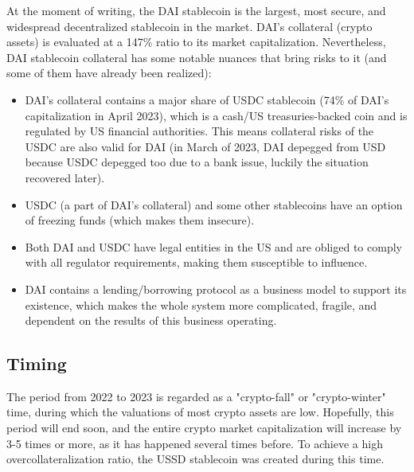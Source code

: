 At the moment of writing, the DAI stablecoin is the largest, most secure, and widespread 
decentralized stablecoin in the market. DAI's collateral (crypto assets) is evaluated at a 
147\% ratio to its market capitalization. Nevertheless, DAI stablecoin collateral has some 
notable nuances that bring risks to it (and some of them have already been realized):
\begin{itemize}
  \item DAI's collateral contains a major share of USDC stablecoin (74\% of DAI's capitalization 
  in April 2023), which is a cash/US treasuries-backed coin and is regulated by US financial authorities. 
  This means collateral risks of the USDC are also valid for DAI (in March of 2023, DAI depegged 
  from USD because USDC depegged too due to a bank issue, luckily the situation recovered later).
  \item USDC (a part of DAI's collateral) and some other stablecoins have an option of freezing 
  funds (which makes them insecure).
  \item Both DAI and USDC have legal entities in the US and are obliged to comply with all 
  regulator requirements, making them susceptible to influence.
  \item DAI contains a lending/borrowing protocol as a business model to support its existence, 
  which makes the whole system more complicated, fragile, and dependent on the results of this 
  business operating.
\end{itemize}

\subsection{Timing}

The period from 2022 to 2023 is regarded as a "crypto-fall" or "crypto-winter" time, during 
which the valuations of most crypto assets are low. Hopefully, this period will end soon, 
and the entire crypto market capitalization will increase by 3-5 times or more, as it has 
happened several times before. To achieve a high overcollateralization ratio, the USSD 
stablecoin was created during this time.






